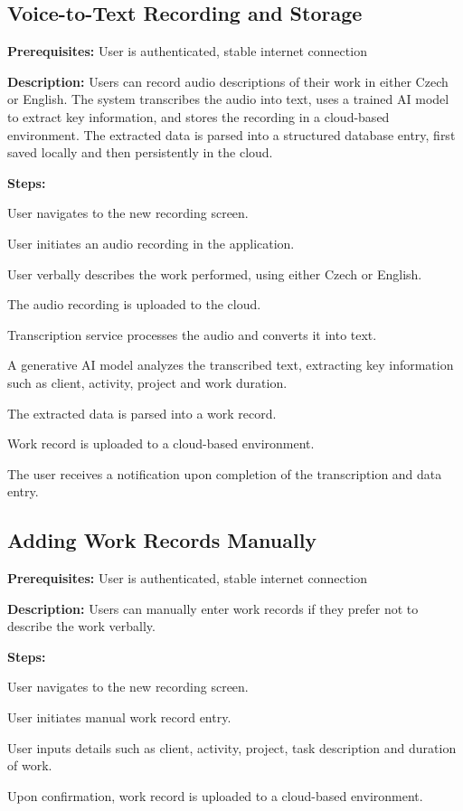 \documentclass[
  digital,     %
  oneside,     %
  nosansbold,  %
  nocolorbold, %
  lof,         %
  lot,         %
]{fithesis4}
\begin{document}
\subsection{Voice-to-Text Recording and Storage}

\noindent \textbf{Prerequisites:} User is authenticated, stable internet connection

\noindent \textbf{Description:}  
Users can record audio descriptions of their work in either Czech or English. The system transcribes the audio into text, uses a trained \gls{AI} model to extract key information, and stores the recording in a cloud-based environment. The extracted data is parsed into a structured database entry, first saved locally and then persistently in the cloud.

\noindent \textbf{Steps:}
\begin{compactenum} 
    \item User navigates to the new recording screen.
    \item User initiates an audio recording in the application.
    \item User verbally describes the work performed, using either Czech or English.
    \item The audio recording is uploaded to the cloud.
    \item Transcription service processes the audio and converts it into text.
    \item A generative \gls{AI} model analyzes the transcribed text, extracting key information such as client, activity, project and work duration.
    \item The extracted data is parsed into a work record.
    \item Work record is uploaded to a cloud-based environment.
    \item The user receives a notification upon completion of the transcription and data entry.
\end{compactenum}

\subsection{Adding Work Records Manually}

\noindent \textbf{Prerequisites:} User is authenticated, stable internet connection

\noindent \textbf{Description:}  
Users can manually enter work records if they prefer not to describe the work verbally.

\noindent \textbf{Steps:}
\begin{compactenum}
    \item User navigates to the new recording screen.
    \item User initiates manual work record entry.
    \item User inputs details such as client, activity, project, task description and duration of work.
    \item Upon confirmation, work record is uploaded to a cloud-based environment.
\end{compactenum}
\end{document}
